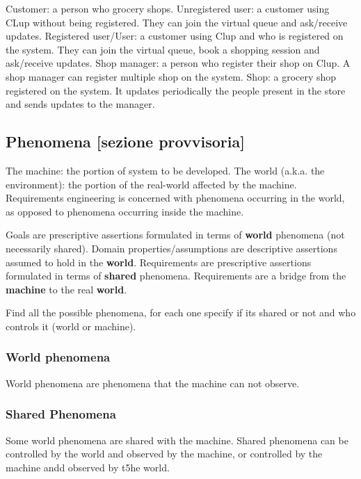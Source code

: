 Customer: a person who grocery shops.
Unregistered user: a customer using CLup without being registered. They can join the virtual queue and ask/receive updates.
Registered user/User: a customer using Clup and who is registered on the system. They can join the virtual queue, book a shopping session and ask/receive updates.
Shop manager: a person who register their shop on Clup. A shop manager can register multiple shop on the system.
Shop: a grocery shop registered on the system. It updates periodically the people present in the store and sends updates to the manager.

\subsection{Phenomena [sezione provvisoria]}
\label{subsect:phenomena}

The machine: the portion of system to be developed.
The world (a.k.a. the environment): the portion of the real-world affected by the machine.
Requirements engineering is concerned with phenomena occurring in the world, as opposed to phenomena occurring inside the machine.

Goals are prescriptive assertions formulated in terms of \textbf{world} phenomena (not necessarily shared).
Domain properties/assumptions are descriptive assertions assumed to hold in the \textbf{world}.
Requirements are prescriptive assertions formulated in terms of \textbf{shared} phenomena.
Requirements are a bridge from the \textbf{machine} to the real \textbf{world}.

Find all the possible phenomena, for each one specify if its shared or not and who controls it (world or machine). 

\subsubsection{World phenomena}
\label{subsubsect:worldphenomena}

World phenomena are phenomena that the machine can not observe.

\subsubsection{Shared Phenomena}
\label{subsubsect:sharedphenomena}

Some world phenomena are shared with the machine.
Shared phenomena can be controlled by the world and observed by the machine, or controlled by the machine andd observed by t5he world.
